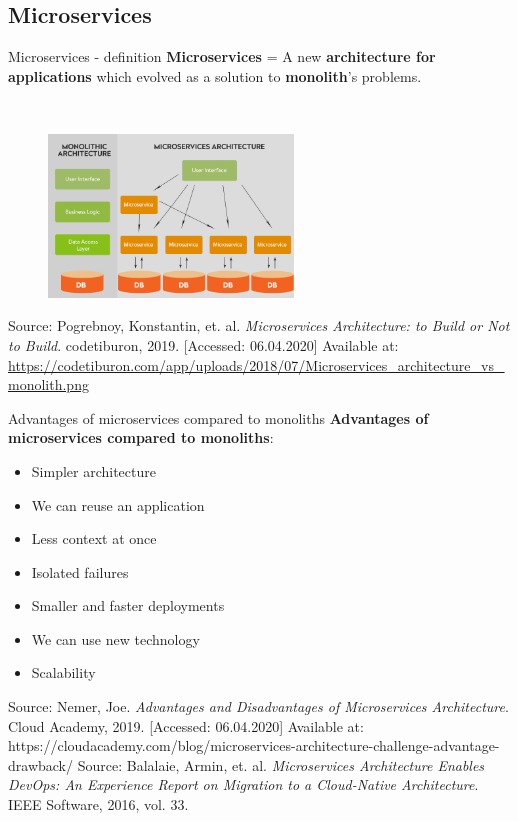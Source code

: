 \documentclass{beamer}
\begin{document}
\subsection{Microservices}
\begin{frame}{Microservices - definition}%
\textbf{Microservices} = A new \textbf{architecture for applications} which evolved as a solution to \textbf{monolith}'s problems.

~\\

\begin{figure}
	\includegraphics[width=6.5cm]{figures/Microservices_architecture_vs_monolith.png}
	\label{fig:micro-vs-mono}
\end{figure} 
\tiny{Source: Pogrebnoy, Konstantin, et. al. \textit{Microservices Architecture: to Build or Not to Build}. codetiburon, 2019. [Accessed: 06.04.2020] Available at: \url{https://codetiburon.com/app/uploads/2018/07/Microservices_architecture_vs_monolith.png}} 
\end{frame}

\begin{frame}{Advantages of microservices compared to monoliths}%
	\textbf{Advantages of microservices compared to monoliths}:
	\begin{itemize}
		\item Simpler architecture
		\item We can reuse an application
		\item Less context at once
		\item Isolated failures
		\item Smaller and faster deployments
		\item We can use new technology
		\item Scalability
	\end{itemize}
	
	\tiny{Source: Nemer, Joe. \textit{Advantages and Disadvantages of Microservices Architecture}. Cloud Academy, 2019. [Accessed: 06.04.2020] Available at: https://cloudacademy.com/blog/microservices-architecture-challenge-advantage-drawback/} 
	\tiny{Source: Balalaie, Armin, et. al. \textit{Microservices Architecture Enables DevOps: An Experience Report on Migration to a Cloud-Native Architecture}. IEEE Software, 2016, vol. 33.} 
	\end{frame}
\end{document}
